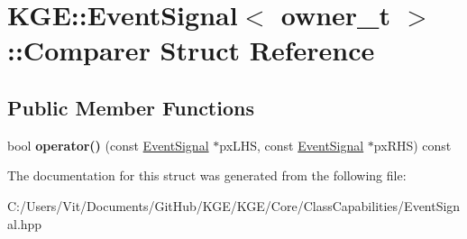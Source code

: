 \hypertarget{struct_k_g_e_1_1_event_signal_1_1_comparer}{\section{K\-G\-E\-:\-:Event\-Signal$<$ owner\-\_\-t $>$\-:\-:Comparer Struct Reference}
\label{struct_k_g_e_1_1_event_signal_1_1_comparer}
}
\subsection*{Public Member Functions}
\begin{DoxyCompactItemize}
\item 
\hypertarget{struct_k_g_e_1_1_event_signal_1_1_comparer_aaf14e9a03427f2d39d74eb9a9caed840}{bool {\bfseries operator()} (const \hyperlink{class_k_g_e_1_1_event_signal}{Event\-Signal} $\ast$px\-L\-H\-S, const \hyperlink{class_k_g_e_1_1_event_signal}{Event\-Signal} $\ast$px\-R\-H\-S) const }\label{struct_k_g_e_1_1_event_signal_1_1_comparer_aaf14e9a03427f2d39d74eb9a9caed840}

\end{DoxyCompactItemize}


The documentation for this struct was generated from the following file\-:\begin{DoxyCompactItemize}
\item 
C\-:/\-Users/\-Vit/\-Documents/\-Git\-Hub/\-K\-G\-E/\-K\-G\-E/\-Core/\-Class\-Capabilities/Event\-Signal.\-hpp\end{DoxyCompactItemize}
